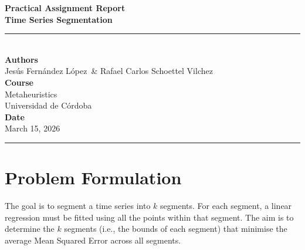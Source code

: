 \documentclass[12pt, a4paper]{article}
\newcommand{\reporttitle}{Time Series Segmentation}
\newcommand{\reportdate}{March 15, 2026}
\newcommand{\authorA}{Jes\'{u}s Fern\'{a}ndez L\'{o}pez}
\newcommand{\authorB}{Rafael Carlos Schoettel Vilchez}
\begin{document}

\begin{titlepage}
  \centering
  \vspace*{3cm}

  {\Huge \textbf{Practical Assignment Report}}\\[0.8cm]
  {\LARGE \textbf{\reporttitle}}\\[0.5cm]
  \rule{\textwidth}{0.4pt}\\[2cm]

  {\Large \textbf{Authors}}\\[0.4cm]
  {\large \authorA\ \& \authorB}\\[1.5cm]

  {\Large \textbf{Course}}\\[0.4cm]
  {\large Metaheuristics}\\[0.4cm]
  {\normalsize Universidad de Córdoba}\\[1.5cm]

  {\Large \textbf{Date}}\\[0.4cm]
  {\large \reportdate}

  \vfill
  \rule{\textwidth}{0.4pt}
\end{titlepage}

\newpage
\tableofcontents
\newpage

\section{Problem Formulation}

The goal is to segment a time series into $k$ segments. For each segment, a linear
regression must be fitted using all the points within that segment. The aim is to
determine the $k$ segments (i.e., the bounds of each segment) that minimise the
average Mean Squared Error across all segments.
\end{document}

